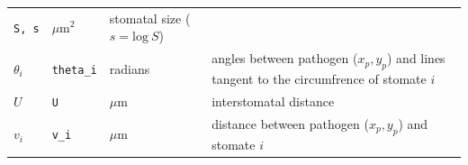 \documentclass[utf8]{frontiersSCNS}
\begin{document}
\begin{longtable}[]{@{}llll@{}}
\begin{minipage}[t]{0.09\columnwidth}
\texttt{S,\ s}\strut
\end{minipage} & \begin{minipage}[t]{0.09\columnwidth}\raggedright
\(\mu\textrm{m}^2\)\strut
\end{minipage} & \begin{minipage}[t]{0.61\columnwidth}\raggedright
stomatal size (\(s = \text{log}~S\))\strut
\end{minipage}\tabularnewline
\begin{minipage}[t]{0.09\columnwidth}\raggedright
\(\theta_i\)\strut
\end{minipage} & \begin{minipage}[t]{0.09\columnwidth}\raggedright
\texttt{theta\_i}\strut
\end{minipage} & \begin{minipage}[t]{0.09\columnwidth}\raggedright
radians\strut
\end{minipage} & \begin{minipage}[t]{0.61\columnwidth}\raggedright
angles between pathogen (\(x_p,y_p\)) and lines tangent to the
circumfrence of stomate \(i\)\strut
\end{minipage}\tabularnewline
\begin{minipage}[t]{0.09\columnwidth}\raggedright
\(U\)\strut
\end{minipage} & \begin{minipage}[t]{0.09\columnwidth}\raggedright
\texttt{U}\strut
\end{minipage} & \begin{minipage}[t]{0.09\columnwidth}\raggedright
\(\mu\textrm{m}\)\strut
\end{minipage} & \begin{minipage}[t]{0.61\columnwidth}\raggedright
interstomatal distance\strut
\end{minipage}\tabularnewline
\begin{minipage}[t]{0.09\columnwidth}\raggedright
\(v_i\)\strut
\end{minipage} & \begin{minipage}[t]{0.09\columnwidth}\raggedright
\texttt{v\_i}\strut
\end{minipage} & \begin{minipage}[t]{0.09\columnwidth}\raggedright
\(\mu\textrm{m}\)\strut
\end{minipage} & \begin{minipage}[t]{0.61\columnwidth}\raggedright
distance between pathogen (\(x_p,y_p\)) and stomate \(i\)\strut
\end{minipage}\tabularnewline

\end{longtable}
\end{document}
